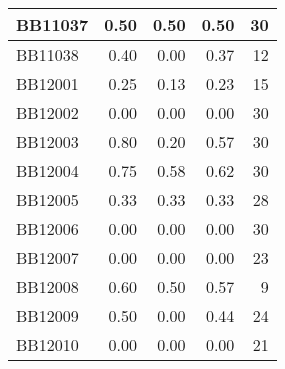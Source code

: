 \begin{longtable}{|l|r|r|r||r|}
	\hline
	BB11037 & \cellcolor[rgb]{ .988,  1,  .992}0.50 & \cellcolor[rgb]{ .988,  1,  .992}0.50 & \cellcolor[rgb]{ .988,  1,  .992}0.50 & \cellcolor[rgb]{ .973,  .412,  .42}30 \\
	\hline
	BB11038 & \cellcolor[rgb]{ .988,  1,  .992}0.40 & \cellcolor[rgb]{ .384,  .745,  .478}0.00 & \cellcolor[rgb]{ .937,  .976,  .949}0.37 & \cellcolor[rgb]{ .984,  .761,  .769}12 \\
	\hline
	BB12001 & \cellcolor[rgb]{ .988,  1,  .992}0.25 & \cellcolor[rgb]{ .384,  .745,  .478}0.13 & \cellcolor[rgb]{ .906,  .965,  .922}0.23 & \cellcolor[rgb]{ .98,  .702,  .71}15 \\
	\hline
	BB12002 & \cellcolor[rgb]{ .988,  1,  .992}0.00 & \cellcolor[rgb]{ .988,  1,  .992}0.00 & \cellcolor[rgb]{ .988,  1,  .992}0.00 & \cellcolor[rgb]{ .973,  .412,  .42}30 \\
	\hline
	BB12003 & \cellcolor[rgb]{ .988,  1,  .992}0.80 & \cellcolor[rgb]{ .384,  .745,  .478}0.20 & \cellcolor[rgb]{ .753,  .898,  .792}0.57 & \cellcolor[rgb]{ .973,  .412,  .42}30 \\
	\hline
	BB12004 & \cellcolor[rgb]{ .988,  1,  .992}0.75 & \cellcolor[rgb]{ .384,  .745,  .478}0.58 & \cellcolor[rgb]{ .522,  .804,  .596}0.62 & \cellcolor[rgb]{ .973,  .412,  .42}30 \\
	\hline
	BB12005 & \cellcolor[rgb]{ .988,  1,  .992}0.33 & \cellcolor[rgb]{ .988,  1,  .992}0.33 & \cellcolor[rgb]{ .988,  1,  .992}0.33 & \cellcolor[rgb]{ .976,  .451,  .459}28 \\
	\hline
	BB12006 & \cellcolor[rgb]{ .988,  1,  .992}0.00 & \cellcolor[rgb]{ .988,  1,  .992}0.00 & \cellcolor[rgb]{ .988,  1,  .992}0.00 & \cellcolor[rgb]{ .973,  .412,  .42}30 \\
	\hline
	BB12007 & \cellcolor[rgb]{ .988,  1,  .992}0.00 & \cellcolor[rgb]{ .988,  1,  .992}0.00 & \cellcolor[rgb]{ .988,  1,  .992}0.00 & \cellcolor[rgb]{ .976,  .549,  .557}23 \\
	\hline
	BB12008 & \cellcolor[rgb]{ .988,  1,  .992}0.60 & \cellcolor[rgb]{ .384,  .745,  .478}0.50 & \cellcolor[rgb]{ .784,  .914,  .82}0.57 & \cellcolor[rgb]{ .984,  .816,  .827}9 \\
	\hline
	BB12009 & \cellcolor[rgb]{ .988,  1,  .992}0.50 & \cellcolor[rgb]{ .384,  .745,  .478}0.00 & \cellcolor[rgb]{ .91,  .965,  .925}0.44 & \cellcolor[rgb]{ .976,  .529,  .537}24 \\
	\hline
	BB12010 & \cellcolor[rgb]{ .988,  1,  .992}0.00 & \cellcolor[rgb]{ .988,  1,  .992}0.00 & \cellcolor[rgb]{ .988,  1,  .992}0.00 & \cellcolor[rgb]{ .98,  .588,  .596}21 \\

\end{longtable}
